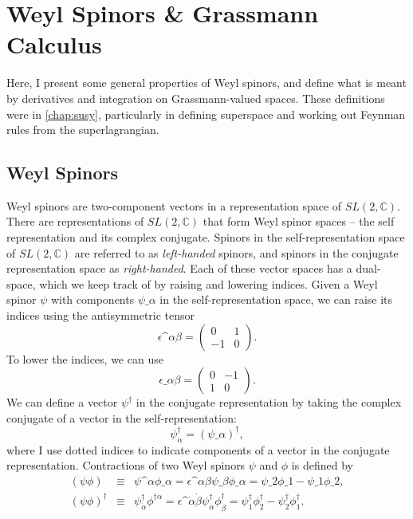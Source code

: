 \documentclass[../main.tex]{subfiles}
\begin{document}
\chapter{Weyl Spinors \& Grassmann Calculus}
\label{app:chap:weyl_grassmann}
Here, I present some general properties of Weyl spinors, and define what is meant by derivatives and integration on Grassmann-valued spaces.
These definitions were in \cref{chap:susy}, particularly in defining superspace and working out Feynman rules from the superlagrangian.

\section{Weyl Spinors}
Weyl spinors are two-component vectors in a representation space of \(SL(2,\mathbb{C})\).
There are representations of \(SL(2,\mathbb{C})\) that form Weyl spinor spaces -- the self representation and its complex conjugate.
Spinors in the self-representation space of \(SL(2, \mathbb{C})\) are referred to as \emph{left-handed} spinors, and spinors in the conjugate representation space as \emph{right-handed}.
Each of these vector spaces has a dual-space, which we keep track of by raising and lowering indices.
Given a Weyl spinor \(\psi\) with components \(\psi\_\alpha\) in the self-representation space, we can raise its indices using the antisymmetric tensor
\begin{equation}
  \epsilon\^{\alpha\beta} = \begin{pmatrix}
    0 & 1 \\ -1 & 0
  \end{pmatrix}.
\end{equation}
To lower the indices, we can use
\begin{equation}
  \epsilon\_{\alpha\beta} = \begin{pmatrix}
    0 & -1 \\ 1 & 0
  \end{pmatrix}.
\end{equation}
We can define a vector \(\psi^\dagger\) in the conjugate representation by taking the complex conjugate of a vector in the self-representation:
\begin{equation}
  \psi_{\dot\alpha}^\dagger = (\psi\_\alpha)^\dagger,
\end{equation}
where I use dotted indices to indicate components of a vector in the conjugate representation.
Contractions of two Weyl spinors \(\psi\) and \(\phi\) is defined by
\begin{subequations}
  \begin{eqnarray}
    (\psi\phi) &\equiv& \psi\^\alpha \phi\_\alpha = \epsilon\^{\alpha\beta} \psi\_\beta \phi\_\alpha = \psi\_2 \phi\_1 - \psi\_1 \phi\_2, \\
    (\psi\phi)^\dagger &\equiv& \psi^\dagger_{\dot\alpha} \phi^{\dagger \dot \alpha} = \epsilon\^{\dot\alpha \dot\beta} \psi^\dagger_{\dot\alpha} \phi^\dagger_{\dot\beta} = \psi^\dagger_1 \phi^\dagger_2 - \psi^\dagger_2 \phi^\dagger_1.
  \end{eqnarray}
\end{subequations}
\medskip
\end{document}

